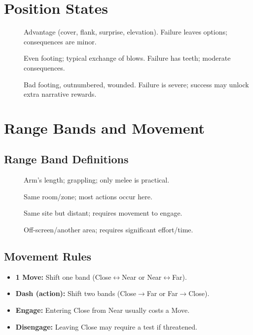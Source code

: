 \section{Position States}
\label{sec:position-states}
\begin{description}
  \item[] Advantage (cover, flank, surprise, elevation). Failure leaves options; consequences are minor. 
  \item[] Even footing; typical exchange of blows. Failure has teeth; moderate consequences. 
  \item[] Bad footing, outnumbered, wounded. Failure is severe; success may unlock extra narrative rewards. 
\end{description}

\section{Range Bands and Movement}
\label{sec:range-bands}

\subsection{Range Band Definitions}
\label{subsec:range-definitions}
\begin{description}
  \item[] Arm’s length; grappling; only melee is practical. 
  \item[] Same room/zone; most actions occur here. 
  \item[] Same site but distant; requires movement to engage. 
  \item[] Off-screen/another area; requires significant effort/time. 
\end{description}

\subsection{Movement Rules}
\label{subsec:movement-rules}
\begin{itemize}
  \item \textbf{1 Move:} Shift one band (Close$\leftrightarrow$Near or Near$\leftrightarrow$Far).
  \item \textbf{Dash (action):} Shift two bands (Close$\rightarrow$Far or Far$\rightarrow$Close).
  \item \textbf{Engage:} Entering Close from Near usually costs a Move.
  \item \textbf{Disengage:} Leaving Close may require a test if threatened.
\end{itemize}

